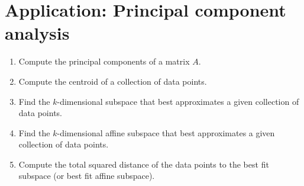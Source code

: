 \section{Application: Principal component analysis}

\begin{outcome}
  \begin{enumerate}
  \item Compute the principal components of a matrix $A$.
  \item Compute the centroid of a collection of data points.
  \item Find the $k$-dimensional subspace that best approximates a
    given collection of data points.
  \item Find the $k$-dimensional affine subspace that best
    approximates a given collection of data points.
  \item Compute the total squared distance of the data points to the
    best fit subspace (or best fit affine subspace).
  \end{enumerate}
\end{outcome}

